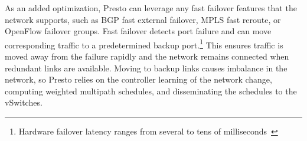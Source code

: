 As an added optimization, Presto can leverage any fast failover features that 
the network supports, such as BGP fast external failover, MPLS fast reroute, or OpenFlow failover groups. Fast failover detects port failure and can move corresponding traffic
to a predetermined backup port.\footnote{Hardware failover latency ranges from several to tens of milliseconds~\cite{ipblog-failover,huawei-failover}}
This ensures traffic is moved away from the failure rapidly and the network
remains connected when redundant links are available.
Moving to backup links causes imbalance in the network,
so Presto relies on the controller learning of the network change, computing weighted multipath schedules, and
disseminating the schedules to the vSwitches. 


%
%
